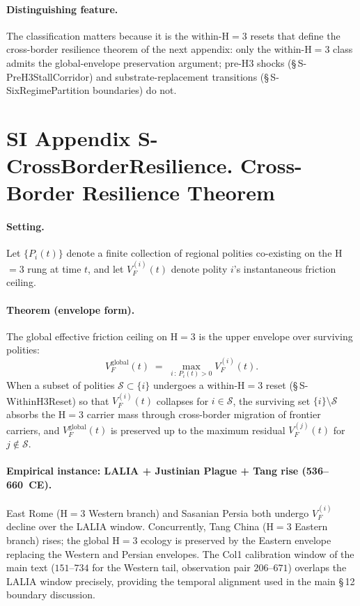 \documentclass[11pt]{article}
\begin{document}
\paragraph{Distinguishing feature.} The classification matters because it is the within-H$=3$ resets that define the cross-border resilience theorem of the next appendix: only the within-H$=3$ class admits the global-envelope preservation argument; pre-H$3$ shocks (\S\,S-PreH3StallCorridor) and substrate-replacement transitions (\S\,S-SixRegimePartition boundaries) do not.

\section*{SI Appendix S-CrossBorderResilience. Cross-Border Resilience Theorem}
\label{sec:S-CrossBorderResilience}

\paragraph{Setting.} Let $\{P_{i}(t)\}$ denote a finite collection of regional polities co-existing on the H$=3$ rung at time $t$, and let $V_{F}^{(i)}(t)$ denote polity $i$'s instantaneous friction ceiling.

\paragraph{Theorem (envelope form).} The global effective friction ceiling on H$=3$ is the upper envelope over surviving polities:
\begin{equation}
  V_{F}^{\mathrm{global}}(t) \;=\; \max_{i\,:\,P_{i}(t)>0} V_{F}^{(i)}(t).
  \tag{S-CrossBorderResilience.1}
\end{equation}
When a subset of polities $\mathcal{S}\subset\{i\}$ undergoes a within-H$=3$ reset (\S\,S-WithinH3Reset) so that $V_{F}^{(i)}(t)$ collapses for $i\in\mathcal{S}$, the surviving set $\{i\}\setminus\mathcal{S}$ absorbs the H$=3$ carrier mass through cross-border migration of frontier carriers, and $V_{F}^{\mathrm{global}}(t)$ is preserved up to the maximum residual $V_{F}^{(j)}(t)$ for $j\notin\mathcal{S}$.

\paragraph{Empirical instance: LALIA + Justinian Plague + Tang rise (536--660~CE).} East Rome (H$=3$ Western branch) and Sasanian Persia both undergo $V_{F}^{(i)}$ decline over the LALIA window. Concurrently, Tang China (H$=3$ Eastern branch) rises; the global H$=3$ ecology is preserved by the Eastern envelope replacing the Western and Persian envelopes. The Col1 calibration window of the main text ($151$--$734$ for the Western tail, observation pair $206$--$671$) overlaps the LALIA window precisely, providing the temporal alignment used in the main \S\,12 boundary discussion.
\end{document}
